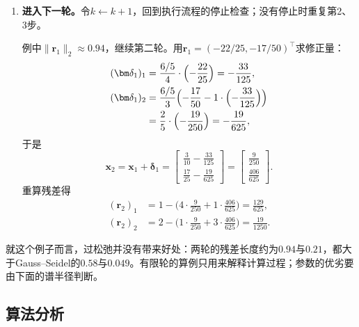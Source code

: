 \begin{enumerate}
 \item \textbf{进入下一轮。}令$k\leftarrow k+1$，回到执行流程的停止检查；没有停止时重复第2、3步。

 例中$\lVert\bm r_1\rVert_2\approx0.94$，继续第二轮。用$\bm r_1=(-22/25,-17/50)^\top$求修正量：
 \[
  \begin{aligned}
  (\bm\delta_1)_1&=\frac{6/5}{4}\cdot\Bigl(-\frac{22}{25}\Bigr)=-\frac{33}{125},\\
  (\bm\delta_1)_2&=\frac{6/5}{3}\Bigl(-\frac{17}{50}-1\cdot\Bigl(-\frac{33}{125}\Bigr)\Bigr)\\
  &=\frac25\cdot\Bigl(-\frac{19}{250}\Bigr)=-\frac{19}{625},
  \end{aligned}
 \]
 于是
 \[
  \bm x_2=\bm x_1+\bm\delta_1=\begin{bmatrix}\tfrac3{10}-\tfrac{33}{125}\\\tfrac{17}{25}-\tfrac{19}{625}\end{bmatrix}=\begin{bmatrix}\tfrac9{250}\\\tfrac{406}{625}\end{bmatrix}.
 \]
 重算残差得
 \[
  \begin{aligned}
  (\bm r_2)_1&=1-\bigl(4\cdot\tfrac9{250}+1\cdot\tfrac{406}{625}\bigr)=\tfrac{129}{625},\\
  (\bm r_2)_2&=2-\bigl(1\cdot\tfrac9{250}+3\cdot\tfrac{406}{625}\bigr)=\tfrac{19}{1250} .
  \end{aligned}
 \]
\end{enumerate}

就这个例子而言，过松弛并没有带来好处：两轮的残差长度约为$0.94$与$0.21$，都大于Gauss--Seidel的$0.58$与$0.049$。有限轮的算例只用来解释计算过程；参数的优劣要由下面的谱半径判断。

\subsection{算法分析}

